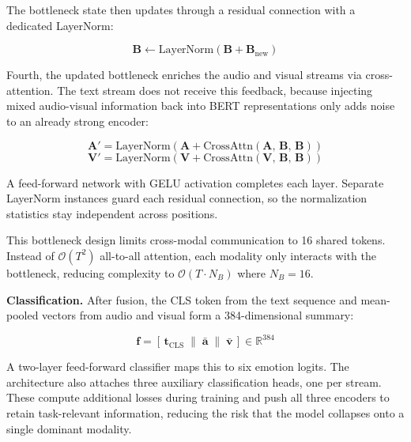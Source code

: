 The bottleneck state then updates through a residual connection with a dedicated LayerNorm:

\begin{equation}
\mathbf{B} \leftarrow \text{LayerNorm}\!\left(\mathbf{B} + \mathbf{B}_{\text{new}}\right)
\end{equation}

Fourth, the updated bottleneck enriches the audio and visual streams via cross-attention. The text stream does not receive this feedback, because injecting mixed audio-visual information back into BERT representations only adds noise to an already strong encoder:

\begin{equation}
\mathbf{A}' = \text{LayerNorm}(\mathbf{A} + \text{CrossAttn}(\mathbf{A},\, \mathbf{B},\, \mathbf{B}))
\end{equation}
\begin{equation}
\mathbf{V}' = \text{LayerNorm}(\mathbf{V} + \text{CrossAttn}(\mathbf{V},\, \mathbf{B},\, \mathbf{B}))
\end{equation}

A feed-forward network with GELU activation completes each layer. Separate LayerNorm instances guard each residual connection, so the normalization statistics stay independent across positions.

This bottleneck design limits cross-modal communication to 16 shared tokens. Instead of $\mathcal{O}(T^2)$ all-to-all attention, each modality only interacts with the bottleneck, reducing complexity to $\mathcal{O}(T \cdot N_B)$ where $N_B = 16$.

\textbf{Classification.} After fusion, the CLS token from the text sequence and mean-pooled vectors from audio and visual form a 384-dimensional summary:

\begin{equation}
\mathbf{f} = [\,\mathbf{t}_{\text{CLS}} \;\|\; \bar{\mathbf{a}} \;\|\; \bar{\mathbf{v}}\,] \in \mathbb{R}^{384}
\end{equation}

A two-layer feed-forward classifier maps this to six emotion logits. The architecture also attaches three auxiliary classification heads, one per stream. These compute additional losses during training and push all three encoders to retain task-relevant information, reducing the risk that the model collapses onto a single dominant modality.


